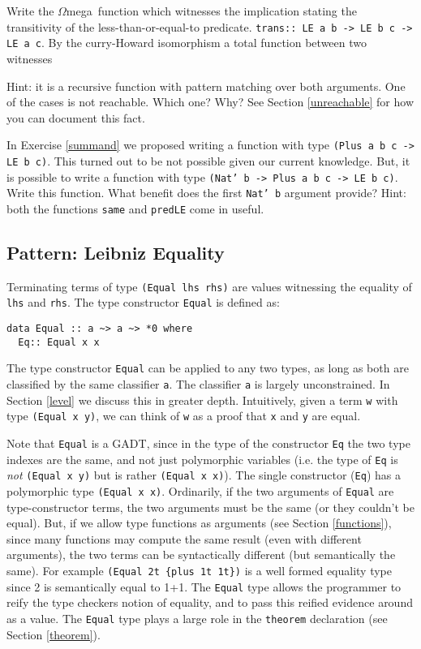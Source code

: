 \documentclass[11pt,twoside,A4]{llncs}
\newcommand{\om}{\emph{$\Omega$}mega}
\begin{document}
\begin{exercise}  \label{trans}

Write the \om\ function which witnesses the implication stating the
transitivity of the less-than-or-equal-to predicate. {\tt trans:: LE a
b -> LE b c -> LE a c}. By the curry-Howard isomorphism a total function
between two witnesses

Hint: it is a recursive function with pattern
matching over both arguments. One of the cases is not reachable. Which
one? Why? See Section \ref{unreachable} for how you can document this
fact. \end{exercise}


\begin{exercise} 
In Exercise \ref{summand} we proposed writing a function with type
{\tt (Plus a b c -> LE b c)}. This turned out to be not possible given
our current knowledge. But,
it is possible to write a function with type
{\tt (Nat' b -> Plus a b c -> LE b c)}. Write this function. What
benefit does the first {\tt Nat' b} argument provide? Hint:
both the functions {\tt same} and {\tt predLE} come in useful.
\end{exercise}


\subsection{Pattern: Leibniz Equality} \label{equal}
Terminating terms of type \verb+(Equal lhs rhs)+ are values witnessing the equality
of {\tt lhs} and {\tt rhs}. The type constructor {\tt Equal} is defined as:

{\small
\begin{verbatim}
data Equal :: a ~> a ~> *0 where
  Eq:: Equal x x
\end{verbatim}}

The type constructor {\tt Equal} can be applied to any
two types, as long as both are classified by the same
classifier {\tt a}. The classifier
{\tt a} is largely unconstrained. In Section \ref{level} we
discuss this in greater depth. Intuitively,
given a term {\tt w} with type {\tt (Equal x y)}, we can
think of {\tt w} as a proof that {\tt x} and {\tt y}
are equal.

Note that {\tt Equal} is a GADT, since in the type of the constructor {\tt Eq} the two type indexes
are the same, and not just polymorphic variables (i.e. the type of
{\tt Eq} is {\em not} {\tt (Equal x y)} but is rather {\tt (Equal x x)}).
The single constructor ({\tt Eq}) has a polymorphic type {\tt(Equal x x)}.
Ordinarily, if the two arguments of {\tt Equal} are type-constructor terms,
the two arguments must be the same (or they couldn't be equal). But, if we
allow type functions as arguments (see Section \ref{functions}), since many functions may compute the
same result (even with different arguments), the two terms can be
syntactically different (but semantically the same).  
For example \verb+(Equal 2t {plus 1t 1t})+ is a well formed equality type
since 2 is semantically equal to 1+1.
The {\tt Equal} type allows the programmer to reify
the type checkers notion of equality, and to pass this reified evidence
around as a value. The {\tt Equal} type plays a large role
in the {\tt theorem} declaration (see Section \ref{theorem}).
\end{document}
